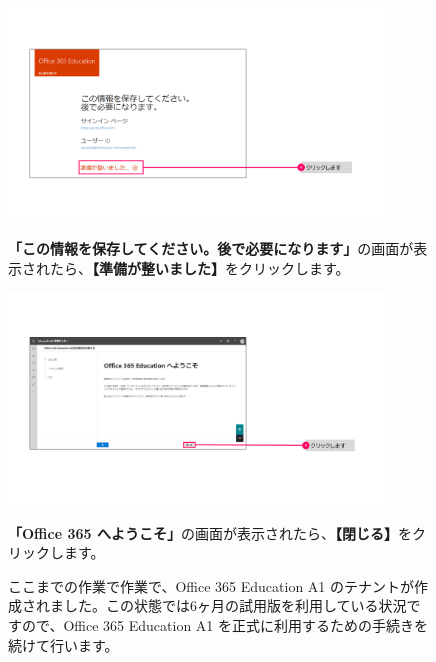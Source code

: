 \begin{figure}[h]
    \begin{minipage}{0.6\textwidth}
        \includegraphics[width=10cm]{figures/O365A1_submission06.png}
    \end{minipage}
    \begin{minipage}{0.4\textwidth}
       \textbf{「この情報を保存してください。後で必要になります」}の画面が表示されたら、\textbf{【準備が整いました】}をクリックします。
    \end{minipage}
\end{figure}

\begin{figure}[h]
    \begin{minipage}{0.6\textwidth}
        \includegraphics[width=10cm]{figures/O365A1_submission07.png}
    \end{minipage}
    \begin{minipage}{0.4\textwidth}
       \textbf{「Office 365 へようこそ」}の画面が表示されたら、\textbf{【閉じる】}をクリックします。
    \end{minipage}
\end{figure}

\begin{figure}[h]
    \begin{minipage}{1.0\textwidth}
        ここまでの作業で作業で、Office 365 Education A1 のテナントが作成されました。この状態では6ヶ月の試用版を利用している状況ですので、Office 365 Education A1 を正式に利用するための手続きを続けて行います。
    \end{minipage}
    \vspace{3cm}
\end{figure}


